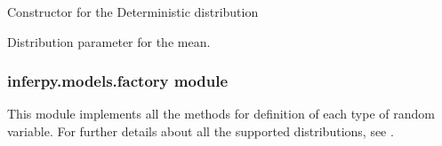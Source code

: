 \documentclass[letterpaper,10pt,english]{sphinxmanual}
\begin{document}
\begin{fulllineitems}
\begin{sphinxVerbatim}[commandchars=\\\{\}]
  

\end{sphinxVerbatim}

\begin{fulllineitems}
\label{\detokenize{modules/inferpy.models:inferpy.models.deterministic.Deterministic.__init__}}
Constructor for the Deterministic distribution

\end{fulllineitems}


\begin{fulllineitems}
\label{\detokenize{modules/inferpy.models:inferpy.models.deterministic.Deterministic.loc}}
Distribution parameter for the mean.

\end{fulllineitems}


\end{fulllineitems}



\subsubsection{inferpy.models.factory module}
\label{\detokenize{modules/inferpy.models:module-inferpy.models.factory}}\label{\detokenize{modules/inferpy.models:inferpy-models-factory-module}}
This module implements all the methods for definition of each type of random variable.
For further details about all the supported distributions,
see  .
\end{document}
